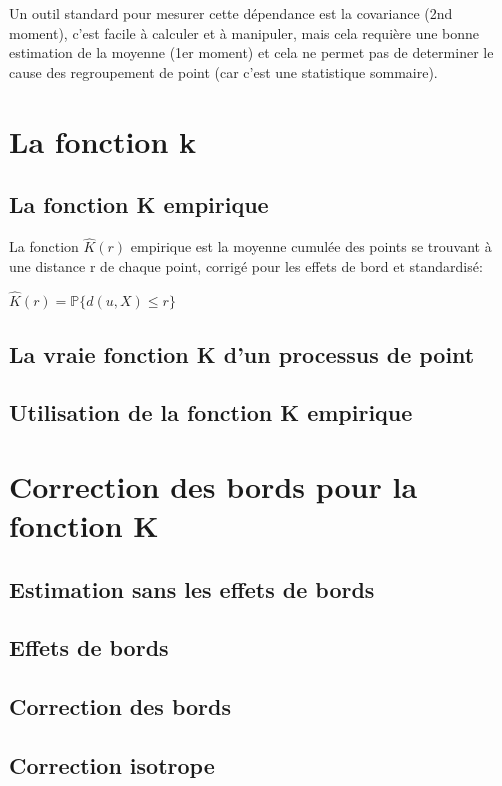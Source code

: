 \documentclass[french,12pt,a4paper]{report}
\begin{document}
Un outil standard pour mesurer cette dépendance est la covariance (2nd moment), c'est facile à calculer et à manipuler, mais cela requière une bonne estimation de la moyenne (1er moment) et cela ne permet pas de determiner le cause des regroupement de point (car c'est une statistique sommaire).


\section{La fonction k}
\subsection{La fonction K empirique}
La fonction \begin{math}\hat{K}(r) \end{math} empirique est la moyenne cumulée des points se trouvant à une distance r de chaque point, corrigé pour les effets de bord et standardisé:
\begin{center}\begin{math} \hat{K}(r) = \mathbb{P}\{ d(u,X) \leq r \} \end{math}\end{center}
\subsection{La vraie fonction K d'un processus de point}
\subsection{Utilisation de la fonction K empirique}


\section{Correction des bords pour la fonction K}
\subsection{Estimation sans les effets de bords}
\subsection{Effets de bords}
\subsection{Correction des bords}
\subsection{Correction isotrope}
\end{document}
